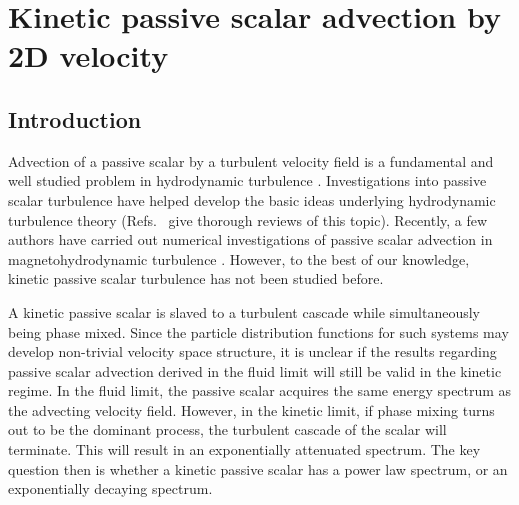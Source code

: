 \chapter{Kinetic passive scalar advection by 2D velocity}
\label{chap:pp0}

\section{Introduction}
\label{pp0:sec:intro}

    Advection of a passive scalar by a turbulent velocity field is a fundamental and well
    studied problem in hydrodynamic turbulence \cite{obukhov49, corrsin51, batchelor59,
    kraichnan68, kraichnan74, kraichnan94, monin75, aref84, chaiken87, ottino89, zeldovich88, ott88, ott89, antonsen91, ramashankar91,
    solomon93, sreenivasan91,
    vanatta91, pierrehumbert94, antonsen95, frisch95, sreenivasan96, boratav97, lesieur97, shraiman00,
    warhaft00}. Investigations into passive scalar
    turbulence have helped develop the basic ideas underlying hydrodynamic turbulence
    theory (Refs.~\cite{sreenivasan91, shraiman00, warhaft00} give thorough reviews of this
    topic). 
    Recently, a few authors have carried out numerical investigations of passive scalar
    advection in magnetohydrodynamic turbulence \cite{maron01, busse08, mason14, sur14}. 
    However, to the best of our
    knowledge, kinetic passive scalar turbulence has not been studied before. 

    A kinetic passive scalar is 
    slaved to a turbulent cascade while simultaneously being phase mixed. Since the particle distribution functions for such
    systems may develop non-trivial velocity space structure, it is unclear if the results
    regarding passive scalar advection derived in the fluid limit will still be valid in the kinetic regime. 
    In the fluid limit, the passive scalar acquires the same
    energy spectrum as the advecting velocity field. However, in the kinetic limit, if
    phase mixing turns out to be the dominant process, the
    turbulent cascade of the scalar will terminate. This will result in an exponentially
    attenuated spectrum. The key question then is whether a kinetic passive scalar
    has a power law spectrum, or an exponentially decaying spectrum.
    

